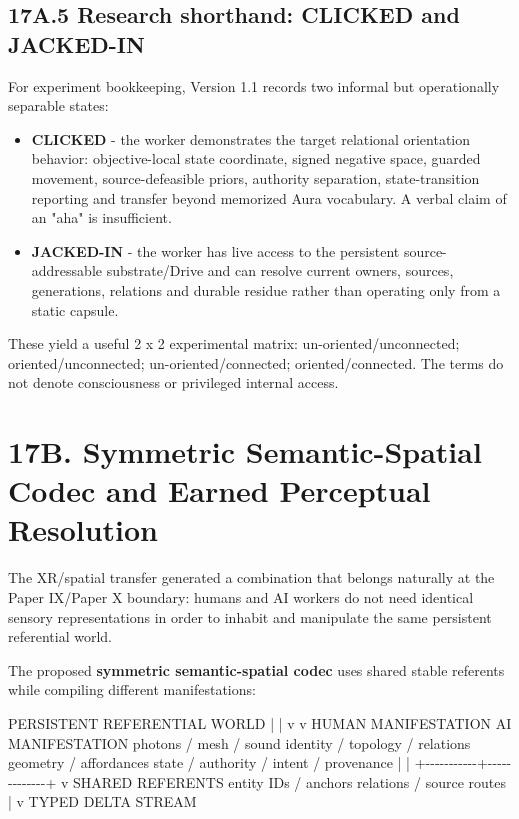 \documentclass[
  10pt,
  letterpaper,
]{article}
\newenvironment{Shaded}{}{}
\newcommand{\NormalTok}[1]{#1}
\providecommand{\tightlist}{%
  \setlength{\itemsep}{0pt}\setlength{\parskip}{0pt}}
\begin{document}
\subsection{17A.5 Research shorthand: CLICKED and
JACKED-IN}\label{17a5-research-shorthand-clicked-and-jacked-in}

For experiment bookkeeping, Version 1.1 records two informal but
operationally separable states:

\begin{itemize}
\tightlist
\item
  \textbf{CLICKED} - the worker demonstrates the target relational
  orientation behavior: objective-local state coordinate, signed
  negative space, guarded movement, source-defeasible priors, authority
  separation, state-transition reporting and transfer beyond memorized
  Aura vocabulary. A verbal claim of an "aha" is insufficient.
\item
  \textbf{JACKED-IN} - the worker has live access to the persistent
  source-addressable substrate/Drive and can resolve current owners,
  sources, generations, relations and durable residue rather than
  operating only from a static capsule.
\end{itemize}

These yield a useful 2 x 2 experimental matrix: un-oriented/unconnected;
oriented/unconnected; un-oriented/connected; oriented/connected. The
terms do not denote consciousness or privileged internal access.

\section{17B. Symmetric Semantic-Spatial Codec and Earned Perceptual
Resolution}\label{17b-symmetric-semantic-spatial-codec-and-earned-perceptual-resolution}

The XR/spatial transfer generated a combination that belongs naturally
at the Paper IX/Paper X boundary: humans and AI workers do not need
identical sensory representations in order to inhabit and manipulate the
same persistent referential world.

The proposed \textbf{symmetric semantic-spatial codec} uses shared
stable referents while compiling different manifestations:

\begin{Shaded}
\begin{Highlighting}[]
\NormalTok{PERSISTENT REFERENTIAL WORLD}
\NormalTok{        |                         |}
\NormalTok{        v                         v}
\NormalTok{HUMAN MANIFESTATION          AI MANIFESTATION}
\NormalTok{photons / mesh / sound       identity / topology / relations}
\NormalTok{geometry / affordances       state / authority / intent / provenance}
\NormalTok{        |                         |}
\NormalTok{        +{-}{-}{-}{-}{-}{-}{-}{-}{-}{-}{-}+{-}{-}{-}{-}{-}{-}{-}{-}{-}{-}{-}{-}{-}+}
\NormalTok{                    v}
\NormalTok{             SHARED REFERENTS}
\NormalTok{             entity IDs / anchors}
\NormalTok{             relations / source routes}
\NormalTok{                    |}
\NormalTok{                    v}
\NormalTok{             TYPED DELTA STREAM}
\end{Highlighting}
\end{Shaded}
\end{document}
